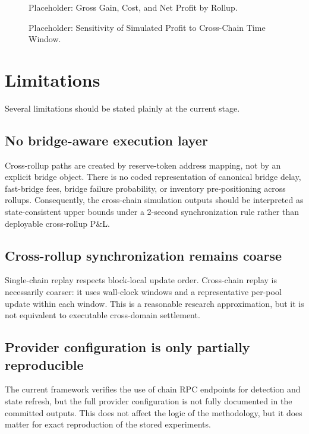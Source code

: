 \documentclass[11pt]{article}
\begin{document}
\begin{figure}[H]
\centering
\fbox{\rule{0pt}{2.2in}\rule{0.9\linewidth}{0pt}}
\caption{Placeholder: Gross Gain, Cost, and Net Profit by Rollup.}
\label{fig:cost_profit}
\end{figure}

\begin{figure}[H]
\centering
\fbox{\rule{0pt}{2.2in}\rule{0.9\linewidth}{0pt}}
\caption{Placeholder: Sensitivity of Simulated Profit to Cross-Chain Time Window.}
\label{fig:window_sensitivity}
\end{figure}

\section{Limitations}

Several limitations should be stated plainly at the current stage.

\subsection{No bridge-aware execution layer}

Cross-rollup paths are created by reserve-token address mapping, not by an explicit bridge object. There is no coded representation of canonical bridge delay, fast-bridge fees, bridge failure probability, or inventory pre-positioning across rollups. Consequently, the cross-chain simulation outputs should be interpreted as state-consistent upper bounds under a 2-second synchronization rule rather than deployable cross-rollup P\&L.

\subsection{Cross-rollup synchronization remains coarse}

Single-chain replay respects block-local update order. Cross-chain replay is necessarily coarser: it uses wall-clock windows and a representative per-pool update within each window. This is a reasonable research approximation, but it is not equivalent to executable cross-domain settlement.

\subsection{Provider configuration is only partially reproducible}

The current framework verifies the use of chain RPC endpoints for detection and state refresh, but the full provider configuration is not fully documented in the committed outputs. This does not affect the logic of the methodology, but it does matter for exact reproduction of the stored experiments.
\end{document}
